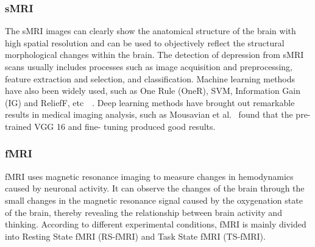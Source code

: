 
\subsubsection{sMRI}
The sMRI images can clearly show the anatomical structure of the brain with high spatial resolution and can be used to objectively reflect the structural morphological changes within the brain.
The detection of depression from sMRI scans usually includes processes such as image acquisition and preprocessing, feature extraction and selection, and classification. Machine learning methods have also been widely used, such as One Rule (OneR), SVM, Information Gain (IG) and ReliefF, etc~\cite{2013Evaluation}~\cite{P2020Radiological}.
Deep learning methods have brought out remarkable results in medical imaging analysis, such as Mousavian et al.~\cite{2019Depression} found that the pre-trained VGG 16 and fine- tuning produced good results.

\subsubsection{fMRI}
fMRI uses magnetic resonance imaging to measure changes in hemodynamics caused by neuronal activity. It can observe the changes of the brain through the small changes in the magnetic resonance signal caused by the oxygenation state of the brain, thereby revealing the relationship between brain activity and thinking. According to different experimental conditions, fMRI is mainly divided into Resting State fMRI (RS-fMRI) and Task State fMRI (TS-fMRI).

